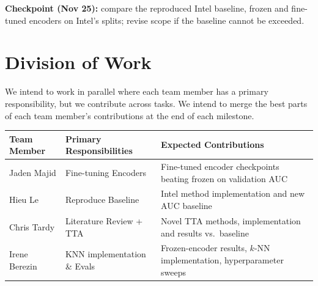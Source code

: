 \documentclass[11pt]{article}
\begin{document}
\textbf{Checkpoint (Nov 25):} compare the reproduced Intel baseline, frozen and fine-tuned encoders on Intel's splits; revise scope if the baseline cannot be exceeded.

\section{Division of Work}

We intend to work in parallel where each team member has a primary responsibility, but we contribute across tasks. We intend to merge the best parts of each team member's contributions at the end of each milestone.

\begin{center}
\begin{tabularx}{\textwidth}{l X X}
    \toprule
    \textbf{Team Member} &
    \textbf{Primary Responsibilities} &
    \textbf{Expected Contributions} \\
    \midrule
    Jaden Majid & Fine-tuning Encoders & Fine-tuned encoder checkpoints beating frozen on validation AUC \\
    Hieu Le & Reproduce Baseline & Intel method implementation and new AUC baseline \\
    Chris Tardy & Literature Review + TTA & Novel TTA methods, implementation and results vs.\ baseline \\
    Irene Berezin & KNN implementation \& Evals & Frozen-encoder results, $k$-NN implementation, hyperparameter sweeps \\
    \bottomrule
\end{tabularx}
\end{center}
\end{document}
